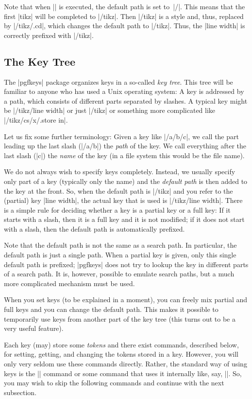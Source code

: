 Note that when |\pgfkeys| is executed, the default path is set
to~|/|. This means that the first |tikz| will be completed to
|/tikz|. Then |/tikz| is a style and, thus, replaced by |/tikz/.cd|,
which changes the default path to |/tikz|. Thus, the |line width| is
correctly prefixed with |/tikz|.

\subsection{The Key Tree}

The |pgfkeys| package organizes keys in a so-called \emph{key
  tree}. This tree will be familiar to anyone who has used a Unix
operating system: A key is addressed by a path, which consists of
different parts separated by slashes. A typical key might be
|/tikz/line width| or just |/tikz| or something more complicated like
|/tikz/cs/x/.store in|.

Let us fix some further terminology: Given a key like |/a/b/c|, we
call the part leading up the last slash (|/a/b|) the \emph{path} of
the key. We call everything after the last slash (|c|) the \emph{name}
of the key (in a file system this would be the file name). 

We do not always wish to specify keys completely. Instead, we usually
specify only part of a key (typically only the name) and the
\emph{default path} is then added to the key at the front. So, when
the default path is |/tikz| and you 
refer to the (partial) key |line width|, the actual key that is used
is |/tikz/line width|. There is a simple rule for deciding whether a
key is a partial key or a full key: If it starts with a slash, then it
is a full key and it is not modified; if it does not start with
a slash, then the default path is automatically prefixed.

Note that the default path is not the same as a search path. In
particular, the default path is just a single path. When a partial key
is given, only this single default path is prefixed; |pgfkeys| does
not try to lookup the key in different parts of a search path. It is,
however, possible to emulate search paths, but a much more
complicated mechanism must be used.

When you set keys (to be explained in a moment), you can freely mix
partial and full keys and you can change the default path. This makes
it possible to temporarily use keys from another part of the key tree
(this turns out to be a very useful feature).

Each key (may) store some \emph{tokens} and there exist commands,
described below, for setting, getting, and changing the tokens stored
in a key. However, you will only very seldom use these commands
directly. Rather, the standard way of using keys is the |\pgfkeys|
command or some command that uses it internally like, say,
|\tikzset|. So, you may wish to skip the following commands and
continue with the next subsection.

